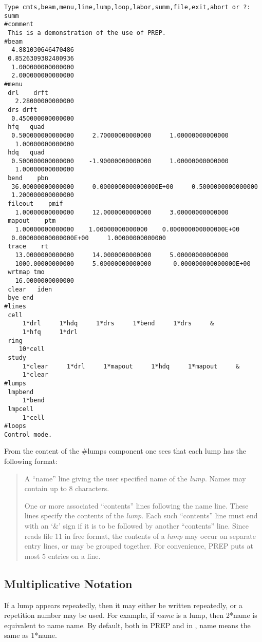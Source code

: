 \begin{footnotesize}
\begin{verbatim}
Type cmts,beam,menu,line,lump,loop,labor,summ,file,exit,abort or ?:
summ
#comment
 This is a demonstration of the use of PREP.
#beam
  4.881030646470486
 0.8526309382400936
  1.000000000000000
  2.000000000000000
#menu
 drl    drft
   2.28000000000000
 drs drft
  0.450000000000000
 hfq   quad
  0.500000000000000     2.70000000000000     1.00000000000000
   1.00000000000000
 hdq   quad
  0.500000000000000    -1.90000000000000     1.00000000000000
   1.00000000000000
 bend    pbn
  36.00000000000000     0.0000000000000000E+00     0.5000000000000000
  1.200000000000000
 fileout    pmif
   1.00000000000000     12.0000000000000     3.00000000000000
 mapout    ptm
   1.00000000000000    1.00000000000000    0.000000000000000E+00
  0.000000000000000E+00     1.00000000000000
 trace    rt
   13.0000000000000     14.0000000000000     5.00000000000000
   1000.00000000000     5.00000000000000      0.000000000000000E+00
 wrtmap tmo
   16.0000000000000
 clear   iden
 bye end
#lines
 cell
     1*drl     1*hdq     1*drs     1*bend     1*drs     &
     1*hfq     1*drl
 ring
    10*cell
 study
     1*clear     1*drl     1*mapout     1*hdq     1*mapout     &
     1*clear
#lumps
 lmpbend
     1*bend
 lmpcell
     1*cell
#loops
Control mode.
\end{verbatim}
\end{footnotesize} From the content of the \#lumps component one sees that
each lump has the following format:
\begin{quotation} A ``name'' line giving the user specified name of the
{\em lump}. Names may contain up to 8 characters.

One or more associated ``contents'' lines following the name line. These
lines specify the contents of the {\em lump}. Each such ``contents'' line
must end with an `\&' sign if it is to be followed by another ``contents''
line. Since \Mary reads file 11 in free format, the contents of a {\em
lump} may occur on separate entry lines, or may be grouped together. For
convenience, PREP puts at most 5 entries on a line.
\end{quotation}

\subsection{Multiplicative Notation} If a lump appears repeatedly, then it
may either be written repeatedly, or a repetition number may be used. For
example, if {\em name} is a lump, then 2*name is equivalent to name name.
By default, both in PREP and in \Mary, name means the same as 1*name.

